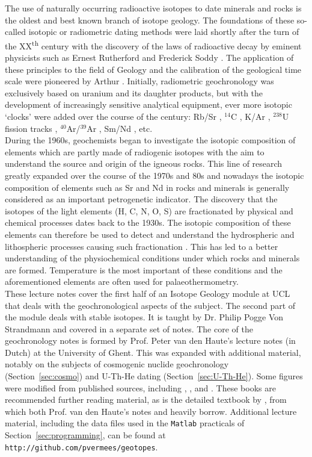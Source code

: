 \documentclass{book}
\begin{document}
The use of naturally occurring radioactive isotopes to date minerals
and rocks is the oldest and best known branch of isotope geology. The
foundations of these so-called isotopic or radiometric dating methods
were laid shortly after the turn of the XX\textsuperscript{th} century
with the discovery of the laws of radioactive decay by eminent
physicists such as Ernest Rutherford and Frederick Soddy
\citep{rutherford1902a, rutherford1902b}.  The application of these
principles to the field of Geology and the calibration of the
geological time scale were pioneered by Arthur \citet{holmes1911,
  holmes1913, holmes1947}. Initially, radiometric geochronology was
exclusively based on uranium and its daughter products, but with the
development of increasingly sensitive analytical equipment, ever more
isotopic `clocks' were added over the course of the century: Rb/Sr
\citep{hahn1943}, $^{14}$C \citep{libby1946}, K/Ar
\citep{aldrich1948}, $^{238}$U fission tracks \citep{price1963},
$^{40}$Ar/$^{39}$Ar \citep{merrihue1966}, Sm/Nd \citep{lugmair1974},
etc.\\

During the 1960s, geochemists began to investigate the isotopic
composition of elements which are partly made of radiogenic isotopes
with the aim to understand the source and origin of the igneous
rocks. This line of research greatly expanded over the course of the
1970s and 80s and nowadays the isotopic composition of elements such
as Sr and Nd in rocks and minerals is generally considered as an
important petrogenetic indicator. The discovery that the isotopes of
the light elements (H, C, N, O, S) are fractionated by physical and
chemical processes dates back to the 1930s. The isotopic composition
of these elements can therefore be used to detect and understand the
hydrospheric and lithospheric processes causing such fractionation
\citep{urey1947}. This has led to a better understanding of the
physiochemical conditions under which rocks and minerals are
formed. Temperature is the most important of these conditions and the
aforementioned elements are often used for palaeothermometry.\\

These lecture notes cover the first half of an Isotope Geology module
at UCL that deals with the geochronological aspects of the subject.
The second part of the module deals with stable isotopes. It is taught
by Dr. Philip Pogge Von Strandmann and covered in a separate set of
notes. The core of the geochronology notes is formed by Prof. Peter
van den Haute's lecture notes (in Dutch) at the University of Ghent.
This was expanded with additional material, notably on the subjects of
cosmogenic nuclide geochronology (Section~\ref{sec:cosmo}) and U-Th-He
dating (Section~\ref{sec:U-Th-He}). Some figures were modified from
published sources, including \citet{allegre2008}, \citet{braun2006},
and \citet{galbraith2005}. These books are recommended further reading
material, as is the detailed textbook by \citet{dickin2005}, from
which both Prof. van den Haute's notes and \citet{allegre2008} heavily
borrow. Additional lecture material, including the data files used in
the \texttt{Matlab} practicals of Section~\ref{sec:programming}, can
be found at \texttt{http://github.com/pvermees/geotopes}.
\end{document}
